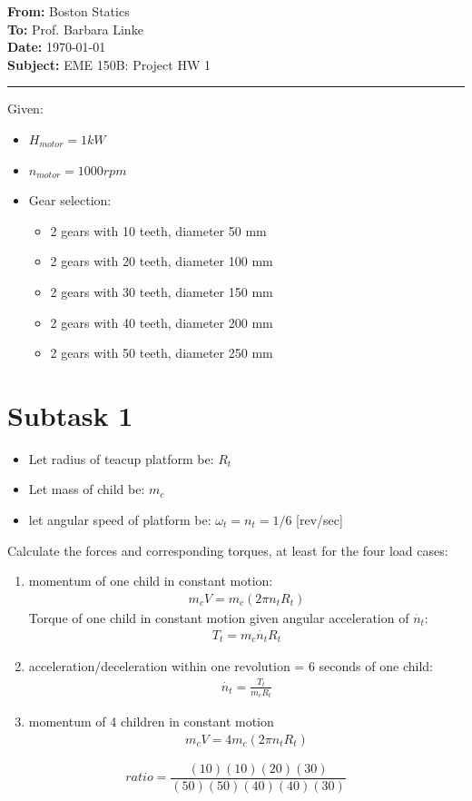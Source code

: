 \documentclass[11pt]{article}
\newcommand{\memoheader}[4]{
  \noindent
  \textbf{From:} #2\\ 
  \textbf{To:} #1\\
  \textbf{Date:} #3\\
  \textbf{Subject:} #4\\[1ex]\hrule\vspace{1.5ex}
}
\begin{document}
\memoheader{Prof. Barbara Linke}
            {Boston Statics}
            {\today}
            {EME 150B: Project HW 1}

\noindent Given:
\begin{itemize}
    \item $H_{motor} = 1kW$
    \item $n_{motor} = 1000 rpm$
    \item Gear selection:
    \begin{itemize}
        \item 2 gears with 10 teeth, diameter 50 mm
        \item 2 gears with 20 teeth, diameter 100 mm
        \item 2 gears with 30 teeth, diameter 150 mm
        \item 2 gears with 40 teeth, diameter 200 mm
        \item 2 gears with 50 teeth, diameter 250 mm
    \end{itemize}
\end{itemize}

\section*{Subtask 1}
\begin{itemize}
    \item Let radius of teacup platform be: $R_t$
    \item Let mass of child be: $m_c$
    \item let angular speed of platform be: $\omega_t=n_t=1/6$ [rev/sec] 
\end{itemize}

Calculate the forces and corresponding torques, at least for the four load cases:
\begin{enumerate}
    \item momentum of one child in constant motion:
    \begin{align*}
        m_cV = m_c(2\pi n_t R_t)
    \end{align*}
    Torque of one child in constant motion given angular acceleration of $\dot{n_t}$:
    \begin{align*}
        T_t = m_c \dot{n_t} R_t 
    \end{align*}
    \item acceleration/deceleration within one revolution = 6 seconds of one child:
    \begin{align*}
      \dot{n_t}=\frac{T_t}{m_c R_t}
    \end{align*}
    \item momentum of 4 children in constant motion
    \begin{align*}
        m_cV = 4m_c(2\pi n_t R_t)
    \end{align*}
\end{enumerate}

$$ratio=\frac{(10) (10) (20) (30)}{(50) (50) (40) (40) (30)}$$
\end{document}
